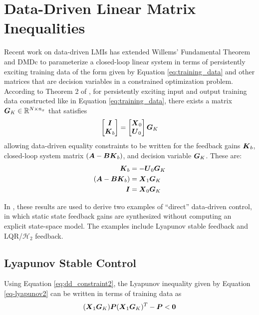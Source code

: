 \section{Data-Driven Linear Matrix Inequalities}
Recent work on data-driven LMIs has extended Willems' Fundamental Theorem and DMDc to parameterize a closed-loop linear system in terms of persistently exciting training data of the form given by Equation \eqref{eq:training_data} and other matrices that are decision variables in a constrained optimization problem.  According to Theorem 2 of \cite{de2019formulas}, for persistently exciting input and output training data constructed like in Equation \eqref{eq:training_data}, there exists a matrix $\vb*{G}_{K} \in \mathbb{R}^{N \times n_{x}}$ that satisfies
\begin{equation}
\begin{aligned}
	\begin{bmatrix} \vb*{I}\\ \vb*{K}_{b} \end{bmatrix} = \begin{bmatrix} \vb*{X}_{0}\\ \vb*{U}_{0} \end{bmatrix} \vb*{G}_{K}
\end{aligned} \label{data_driven_parameterization2}
\end{equation}
allowing data-driven equality constraints to be written for the feedback gains $\vb*{K}_{b}$, closed-loop system matrix $(\vb*{A} - \vb*{B}\vb*{K}_{b})$, and decision variable $\vb*{G}_{K}$.  These are:
\begin{subequations}
\label{eq:data_driven_constraints}
\begin{align}
	\vb*{K}_{b} &= -\vb*{U}_{0}\vb*{G}_{K} \label{eq:dd_constraint1}\\
	(\vb*{A} - \vb*{B}\vb*{K}_{b}) &= \vb*{X}_{1}\vb*{G}_{K} \label{eq:dd_constraint2}\\
	\vb*{I} &= \vb*{X}_{0}\vb*{G}_{K} \label{eq:dd_constraint3}
\end{align}
\end{subequations}

In \cite{de2019formulas}, these results are used to derive two examples of ``direct'' data-driven control, in which static state feedback gains are synthesized without computing an explicit state-space model.  The examples include Lyapunov stable feedback and LQR/$\mathcal{H}_{2}$ feedback.

\subsection{Lyapunov Stable Control}
\label{sect:dataDrivenLyapunov}
Using Equation \eqref{eq:dd_constraint2}, the Lyapunov inequality given by Equation \eqref{eq-lyapunov2} can be written in terms of training data as
\begin{equation}
\label{eq:lyapunov2_dd}
\begin{aligned}
	(\vb*{X}_{1}\vb*{G}_{K}) \vb*{P} (\vb*{X}_{1}\vb*{G}_{K})^{T} - \vb*{P} < \vb*{0}
\end{aligned}
\end{equation}

